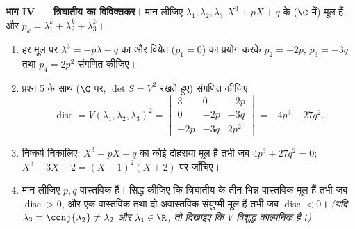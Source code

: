 \begin{problem}
\medskip \noindent\textbf{भाग IV --- त्रिघातीय का विविक्तकर।} मान लीजिए
$\lambda_1, \lambda_2, \lambda_3$ $X^3 + pX + q$ के ($\C$ में) मूल हैं, और
$p_k = \lambda_1^k + \lambda_2^k + \lambda_3^k$।
\begin{enumerate}[resume]
  \item हर मूल पर $\lambda^3 = -p\lambda - q$ का और वियेत ($p_1 = 0$) का
  प्रयोग करके $p_2 = -2p$, $p_3 = -3q$ तथा $p_4 = 2p^2$ संगणित कीजिए।
  \item प्रश्न 5 के साथ ($\C$ पर, $\det S = V^2$ रखते हुए) संगणित कीजिए
        \[
        \operatorname{disc} = V(\lambda_1, \lambda_2,
        \lambda_3)^2 = \begin{vmatrix}
        3 & 0 & -2p\\
        0 & -2p & -3q\\
        -2p & -3q & 2p^2
        \end{vmatrix}
        = -4p^3 - 27q^2 .
        \]
  \item निष्कर्ष निकालिए: $X^3 + pX + q$ का कोई दोहराया मूल है तभी जब $4p^3
  + 27q^2 = 0$; $X^3 - 3X + 2 = (X - 1)^2(X + 2)$ पर जाँचिए।
  \item मान लीजिए $p, q$ वास्तविक हैं। सिद्ध कीजिए कि त्रिघातीय के तीन भिन्न
  वास्तविक मूल हैं तभी जब $\operatorname{disc} > 0$, और एक वास्तविक तथा दो
  अवास्तविक संयुग्मी मूल हैं तभी जब $\operatorname{disc} < 0$। \emph{(यदि
  $\lambda_3 = \conj{\lambda_2} \neq \lambda_2$ और $\lambda_1 \in \R$, तो
  दिखाइए कि $V$ विशुद्ध काल्पनिक है।)}
\end{enumerate}


\end{problem}
